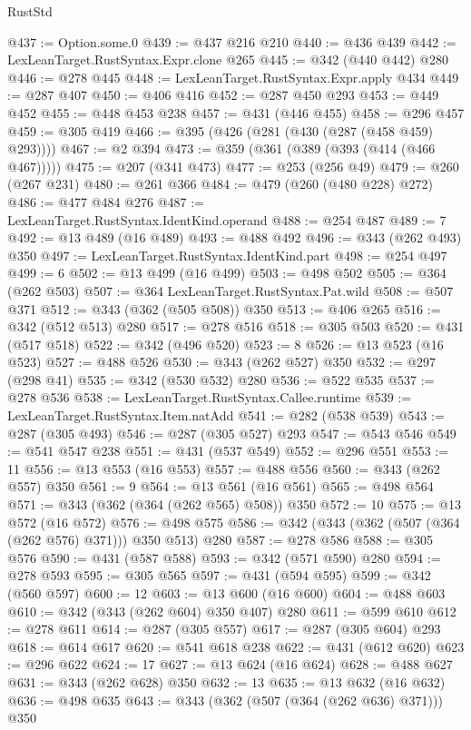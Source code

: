 \begin{lexlean}{RustStd}
\begin{coremodule}
@437 := Option.some.{0}
@439 := @437 @216 @210
@440 := @436 @439
@442 := LexLeanTarget.RustSyntax.Expr.clone @265
@445 := @342 (@440 @442) @280
@446 := @278 @445
@448 := LexLeanTarget.RustSyntax.Expr.apply @434
@449 := @287 @407
@450 := @406 @416
@452 := @287 @450 @293
@453 := @449 @452
@455 := @448 @453 @238
@457 := @431 (@446 @455)
@458 := @296 @457
@459 := @305 @419
@466 := @395 (@426 (@281 (@430 (@287 (@458 @459) @293))))
@467 := @2 @394
@473 := @359 (@361 (@389 (@393 (@414 (@466 @467)))))
@475 := @207 (@341 @473)
@477 := @253 (@256 @49)
@479 := @260 (@267 @231)
@480 := @261 @366
@484 := @479 (@260 (@480 @228) @272)
@486 := @477 @484 @276
@487 := LexLeanTarget.RustSyntax.IdentKind.operand
@488 := @254 @487
@489 := 7
@492 := @13 @489 (@16 @489)
@493 := @488 @492
@496 := @343 (@262 @493) @350
@497 := LexLeanTarget.RustSyntax.IdentKind.part
@498 := @254 @497
@499 := 6
@502 := @13 @499 (@16 @499)
@503 := @498 @502
@505 := @364 (@262 @503)
@507 := @364 LexLeanTarget.RustSyntax.Pat.wild
@508 := @507 @371
@512 := @343 (@362 (@505 @508)) @350
@513 := @406 @265
@516 := @342 (@512 @513) @280
@517 := @278 @516
@518 := @305 @503
@520 := @431 (@517 @518)
@522 := @342 (@496 @520)
@523 := 8
@526 := @13 @523 (@16 @523)
@527 := @488 @526
@530 := @343 (@262 @527) @350
@532 := @297 (@298 @41)
@535 := @342 (@530 @532) @280
@536 := @522 @535
@537 := @278 @536
@538 := LexLeanTarget.RustSyntax.Callee.runtime
@539 := LexLeanTarget.RustSyntax.Item.natAdd
@541 := @282 (@538 @539)
@543 := @287 (@305 @493)
@546 := @287 (@305 @527) @293
@547 := @543 @546
@549 := @541 @547 @238
@551 := @431 (@537 @549)
@552 := @296 @551
@553 := 11
@556 := @13 @553 (@16 @553)
@557 := @488 @556
@560 := @343 (@262 @557) @350
@561 := 9
@564 := @13 @561 (@16 @561)
@565 := @498 @564
@571 := @343 (@362 (@364 (@262 @565) @508)) @350
@572 := 10
@575 := @13 @572 (@16 @572)
@576 := @498 @575
@586 := @342 (@343 (@362 (@507 (@364 (@262 @576) @371))) @350 @513) @280
@587 := @278 @586
@588 := @305 @576
@590 := @431 (@587 @588)
@593 := @342 (@571 @590) @280
@594 := @278 @593
@595 := @305 @565
@597 := @431 (@594 @595)
@599 := @342 (@560 @597)
@600 := 12
@603 := @13 @600 (@16 @600)
@604 := @488 @603
@610 := @342 (@343 (@262 @604) @350 @407) @280
@611 := @599 @610
@612 := @278 @611
@614 := @287 (@305 @557)
@617 := @287 (@305 @604) @293
@618 := @614 @617
@620 := @541 @618 @238
@622 := @431 (@612 @620)
@623 := @296 @622
@624 := 17
@627 := @13 @624 (@16 @624)
@628 := @488 @627
@631 := @343 (@262 @628) @350
@632 := 13
@635 := @13 @632 (@16 @632)
@636 := @498 @635
@643 := @343 (@362 (@507 (@364 (@262 @636) @371))) @350

\end{coremodule}
\end{lexlean}
